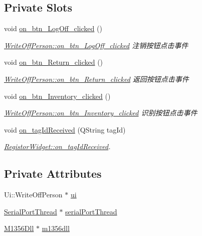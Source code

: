 \subsection*{Private Slots}
\begin{DoxyCompactItemize}
\item 
void \mbox{\hyperlink{class_write_off_person_a4ac5c022a769acb97dfb615a2fceb1f3}{on\+\_\+btn\+\_\+\+Log\+Off\+\_\+clicked}} ()
\begin{DoxyCompactList}\small\item\em \mbox{\hyperlink{class_write_off_person_a4ac5c022a769acb97dfb615a2fceb1f3}{Write\+Off\+Person\+::on\+\_\+btn\+\_\+\+Log\+Off\+\_\+clicked}} 注销按钮点击事件 \end{DoxyCompactList}\item 
void \mbox{\hyperlink{class_write_off_person_ab1256ef9bad90ead6cbe0f925adf05f7}{on\+\_\+btn\+\_\+\+Return\+\_\+clicked}} ()
\begin{DoxyCompactList}\small\item\em \mbox{\hyperlink{class_write_off_person_ab1256ef9bad90ead6cbe0f925adf05f7}{Write\+Off\+Person\+::on\+\_\+btn\+\_\+\+Return\+\_\+clicked}} 返回按钮点击事件 \end{DoxyCompactList}\item 
void \mbox{\hyperlink{class_write_off_person_a46c1284c1eb58a77b86218af80712c74}{on\+\_\+btn\+\_\+\+Inventory\+\_\+clicked}} ()
\begin{DoxyCompactList}\small\item\em \mbox{\hyperlink{class_write_off_person_a46c1284c1eb58a77b86218af80712c74}{Write\+Off\+Person\+::on\+\_\+btn\+\_\+\+Inventory\+\_\+clicked}} 识别按钮点击事件 \end{DoxyCompactList}\item 
void \mbox{\hyperlink{class_write_off_person_a5c38bb89e0bb35cc0123d04b9c076260}{on\+\_\+tag\+Id\+Received}} (Q\+String tag\+Id)
\begin{DoxyCompactList}\small\item\em \mbox{\hyperlink{class_registor_widget_a7f2af14f69efa2bdc0d57f9957cc1dc1}{Registor\+Widget\+::on\+\_\+tag\+Id\+Received}}. \end{DoxyCompactList}\end{DoxyCompactItemize}
\subsection*{Private Attributes}
\begin{DoxyCompactItemize}
\item 
Ui\+::\+Write\+Off\+Person $\ast$ \mbox{\hyperlink{class_write_off_person_aaf19403b2f951f81bbd58c246247b64d}{ui}}
\item 
\mbox{\hyperlink{class_serial_port_thread}{Serial\+Port\+Thread}} $\ast$ \mbox{\hyperlink{class_write_off_person_ac1a66c10d4db76eaf05c2aedff8b26e9}{serial\+Port\+Thread}}
\item 
\mbox{\hyperlink{class_m1356_dll}{M1356\+Dll}} $\ast$ \mbox{\hyperlink{class_write_off_person_acf0c00685b05bdb134d2dbf715ea041b}{m1356dll}}
\end{DoxyCompactItemize}


